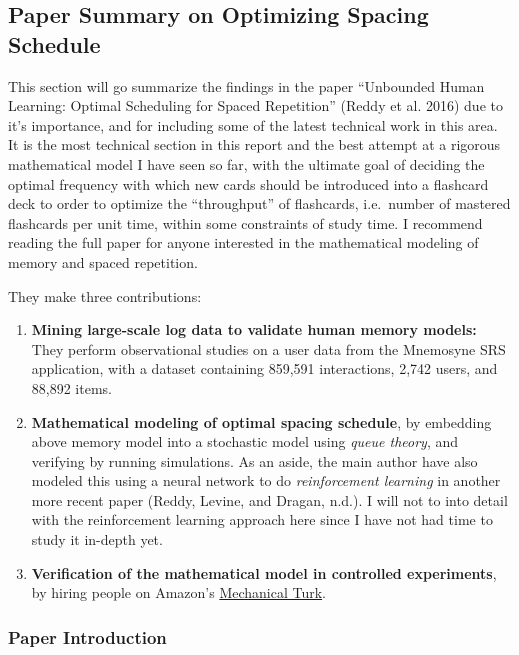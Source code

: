 \hypertarget{paper-summary-on-optimizing-spacing-schedule}{\subsection{Paper
Summary on Optimizing Spacing
Schedule}\label{paper-summary-on-optimizing-spacing-schedule}}

This section will go summarize the findings in the paper ``Unbounded
Human Learning: Optimal Scheduling for Spaced Repetition'' (Reddy et al.
2016) due to it's importance, and for including some of the latest
technical work in this area. It is the most technical section in this
report and the best attempt at a rigorous mathematical model I have seen
so far, with the ultimate goal of deciding the optimal frequency with
which new cards should be introduced into a flashcard deck to order to
optimize the ``throughput'' of flashcards, i.e.~number of mastered
flashcards per unit time, within some constraints of study time. I
recommend reading the full paper for anyone interested in the
mathematical modeling of memory and spaced repetition.

They make three contributions:

\begin{enumerate}
\def\labelenumi{\arabic{enumi}.}
\tightlist
\item
  \textbf{Mining large-scale log data to validate human memory models:}
  They perform observational studies on a user data from the Mnemosyne
  SRS application, with a dataset containing 859,591 interactions, 2,742
  users, and 88,892 items.
\item
  \textbf{Mathematical modeling of optimal spacing schedule}, by
  embedding above memory model into a stochastic model using \emph{queue
  theory}, and verifying by running simulations. As an aside, the main
  author have also modeled this using a neural network to do
  \emph{reinforcement learning} in another more recent paper (Reddy,
  Levine, and Dragan, n.d.). I will not to into detail with the
  reinforcement learning approach here since I have not had time to
  study it in-depth yet.
\item
  \textbf{Verification of the mathematical model in controlled
  experiments}, by hiring people on Amazon's
  \href{https://www.mturk.com/mturk/welcome}{Mechanical Turk}.
\end{enumerate}

\subsubsection{Paper Introduction}\label{paper-introduction}

